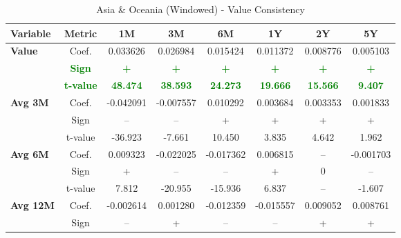 \documentclass[11pt,english,a4paper,hidelinks]{book}
\begin{document}
\begin{table}[H]
    \centering
    \caption{Asia \& Oceania (Windowed) - Value Consistency}
    \begin{tabular}{lccccccc}
        \toprule
        \textbf{Variable} & \textbf{Metric} & \textbf{1M} & \textbf{3M} & \textbf{6M} & \textbf{1Y} & \textbf{2Y} & \textbf{5Y} \\
        \midrule
        \multirow{3}{*}{\textbf{Value}}
            & Coef.   & 0.033626  & 0.026984  & 0.015424  & 0.011372  & 0.008776  & 0.005103  \\
            & \textbf{\textcolor{green}{Sign}}
                     & \textbf{\textcolor{green}{+}}
                     & \textbf{\textcolor{green}{+}}
                     & \textbf{\textcolor{green}{+}}
                     & \textbf{\textcolor{green}{+}}
                     & \textbf{\textcolor{green}{+}}
                     & \textbf{\textcolor{green}{+}} \\
            & \textbf{\textcolor{green}{t-value}}
                     & \textbf{\textcolor{green}{48.474}}
                     & \textbf{\textcolor{green}{38.593}}
                     & \textbf{\textcolor{green}{24.273}}
                     & \textbf{\textcolor{green}{19.666}}
                     & \textbf{\textcolor{green}{15.566}}
                     & \textbf{\textcolor{green}{9.407}} \\
        \cmidrule{1-8}
        \multirow{3}{*}{\textbf{Avg 3M}}
            & Coef.   & -0.042091 & -0.007557 & 0.010292  & 0.003684  & 0.003353  & 0.001833  \\
            & Sign    & –         & –         & +         & +         & +         & +         \\
            & t-value & -36.923   & -7.661    & 10.450    & 3.835     & 4.642     & 1.962     \\
        \cmidrule{1-8}
        \multirow{3}{*}{\textbf{Avg 6M}}
            & Coef.   & 0.009323  & -0.022025 & -0.017362 & 0.006815  & --        & -0.001703 \\
            & Sign    & +         & –         & –         & +         & 0         & –         \\
            & t-value & 7.812     & -20.955   & -15.936   & 6.837     & --        & -1.607    \\
        \cmidrule{1-8}
        \multirow{3}{*}{\textbf{Avg 12M}}
            & Coef.   & -0.002614 & 0.001280  & -0.012359 & -0.015557 & 0.009052  & 0.008761  \\
            & Sign    & –         & +         & –         & –         & +         & +         \\

\end{tabular}
\end{table}
\end{document}
